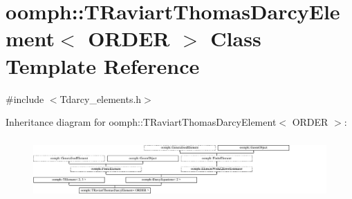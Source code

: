 \hypertarget{classoomph_1_1TRaviartThomasDarcyElement}{}\section{oomph\+:\+:T\+Raviart\+Thomas\+Darcy\+Element$<$ O\+R\+D\+ER $>$ Class Template Reference}
\label{classoomph_1_1TRaviartThomasDarcyElement}


{\ttfamily \#include $<$Tdarcy\+\_\+elements.\+h$>$}

Inheritance diagram for oomph\+:\+:T\+Raviart\+Thomas\+Darcy\+Element$<$ O\+R\+D\+ER $>$\+:\begin{figure}[H]
\begin{center}
\leavevmode
\includegraphics[height=2.341137cm]{classoomph_1_1TRaviartThomasDarcyElement}
\end{center}
\end{figure}

